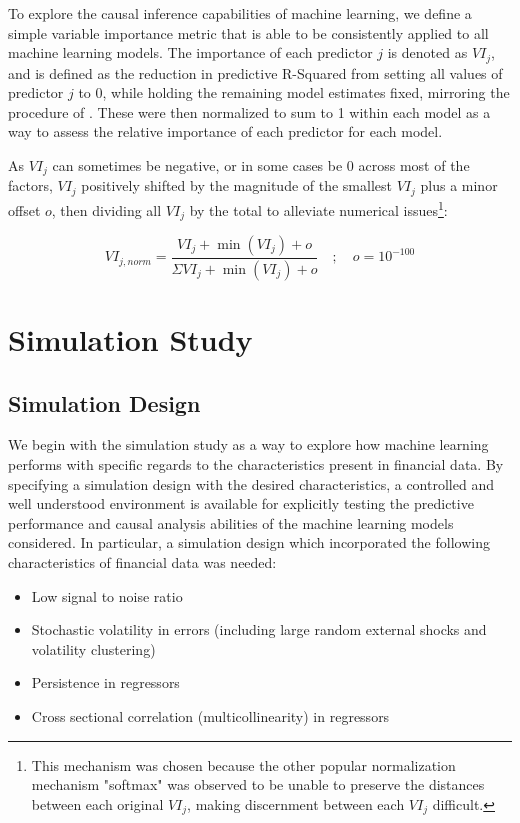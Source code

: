 \documentclass[11pt, a4paper, table]{article}
\begin{document}
To explore the causal inference capabilities of machine learning, we define a simple variable importance metric that is able to be consistently applied to all machine learning models. The importance of each predictor $j$ is denoted as $VI_j$, and is defined as the reduction in predictive R-Squared from setting all values of predictor $j$ to 0, while holding the remaining model estimates fixed, mirroring the procedure of \cite{gu_empirical_2018}. These were then normalized to sum to 1 within each model as a way to assess the relative importance of each predictor for each model. 

As $VI_j$ can sometimes be negative, or in some cases be 0 across most of the factors, $VI_j$ positively shifted by the magnitude of the smallest $VI_j$ plus a minor offset $o$, then dividing all $VI_j$ by the total to alleviate numerical issues\footnote{This mechanism was chosen because the other popular normalization mechanism "softmax" was observed to be unable to preserve the distances between each original $VI_j$, making discernment between each $VI_j$ difficult.}:

\begin{equation}
VI_{j, norm} = \frac{VI_j + \operatorname{min}(VI_j) + o}
{\Sigma VI_j + \operatorname{min}(VI_j) + o} \quad ; \quad o = 10^{-100}
\end{equation}

\newpage

\section{Simulation Study}

\subsection{Simulation Design}

We begin with the simulation study as a way to explore how machine learning performs with specific regards to the characteristics present in financial data. By specifying a simulation design with the desired characteristics, a controlled and well understood environment is available for explicitly testing the predictive performance and causal analysis abilities of the machine learning models considered. In particular, a simulation design which incorporated the following characteristics of financial data was needed:

\begin{itemize}
\item Low signal to noise ratio
\item Stochastic volatility in errors (including large random external shocks and volatility clustering)
\item Persistence in regressors
\item Cross sectional correlation (multicollinearity) in regressors
\end{itemize}
\end{document}
